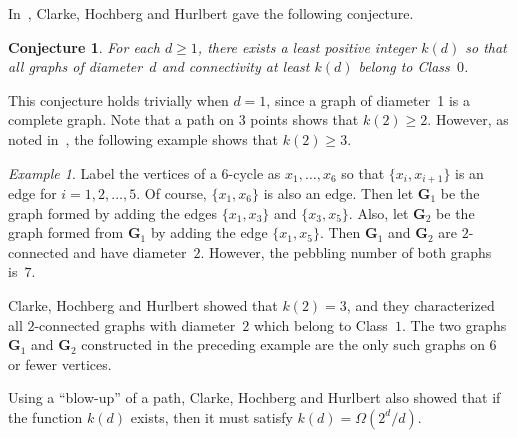 \documentclass{amsart}
\newtheorem{conjecture}[theorem]{Conjecture}
\theoremstyle{remark}
\newtheorem{example}[theorem]{Example}
\newcommand{\bfG}{\mathbf{G}}
\begin{document}
In~\cite{CHH}, Clarke, Hochberg and Hurlbert gave
the following conjecture.
\begin{conjecture}\label{c:CHH}
For each $d\ge1$, there exists a least positive 
integer $k(d)$ so that all graphs of diameter~$d$ and 
connectivity at least $k(d)$ belong to Class~$0$. 
\end{conjecture}
This conjecture holds trivially when $d=1$, since a graph of 
diameter~1 is a complete graph.  Note that a path on $3$ 
points shows that $k(2)\ge 2$.  However, as noted
in~\cite{CHH}, the following example shows that $k(2)\ge3$.
\begin{example}\label{e:exam}
Label the vertices of a $6$-cycle as
$x_1,\dots,x_6$ so that $\{x_i,x_{i+1}\}$ is an edge for
$i=1,2,\dots,5$.  Of course, $\{x_1,x_6\}$ is also an edge.
Then let $\bfG_1$ be the graph formed by adding the edges 
$\{x_1,x_3\}$ and $\{x_3,x_5\}$.  Also, let $\bfG_2$ be
the graph formed from $\bfG_1$ by adding the edge $\{x_1,x_5\}$.  
Then $\bfG_1$ and $\bfG_2$ are $2$-connected and have diameter~$2$.  
However, the pebbling number of both graphs is~$7$.
\end{example}
Clarke, Hochberg and Hurlbert showed that $k(2)=3$, and they 
characterized all $2$-connected graphs with diameter~$2$ which belong 
to Class~$1$.  The two graphs $\bfG_1$ and $\bfG_2$ constructed in
the preceding example are the only such graphs on $6$ or fewer 
vertices.  

Using a ``blow-up'' of a path, Clarke, Hochberg and Hurlbert also
showed that if the function $k(d)$ exists, then it must 
satisfy $k(d)=\Omega(2^d/d)$.
\end{document}
